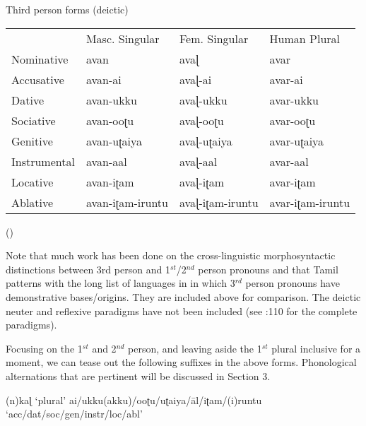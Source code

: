 \documentclass[output=paper,colorlinks,citecolor=brown,
]{langscibook}
\begin{document}
\begin{exe}
\begin{xlist}
\ex \label{new2c} Third person forms (deictic) 
\begin{table}[ht]
\begin{tabular}{llll}
             & Masc. Singular   & Fem. Singular    & Human Plural     \\
Nominative   & avan             & avaɭ             & avar             \\
Accusative   & avan-ai          & avaɭ-ai          & avar-ai          \\
Dative       & avan-ukku        & avaɭ-ukku        & avar-ukku        \\
Sociative    & avan-ooʈu        & avaɭ-ooʈu        & avar-ooʈu        \\
Genitive     & avan-uʈaiya      & avaɭ-uʈaiya      & avar-uʈaiya      \\
Instrumental & avan-aal         & avaɭ-aal         & avar-aal         \\
Locative     & avan-iʈam        & avaɭ-iʈam        & avar-iʈam        \\
Ablative     & avan-iʈam-iruntu & avaɭ-iʈam-iruntu & avar-iʈam-iruntu
\end{tabular} 
\end{table} (\citet{steever2019dravidian})

\end{xlist}
\end{exe}

Note that much work has been done on the cross-linguistic morphosyntactic distinctions between 3rd person and 1$^{st}$/2$^{nd}$ person pronouns and that Tamil patterns with the long list of languages in \citet{harley2002person} in which 3$^{rd}$ person pronouns have demonstrative bases/origins. They are included above for comparison. The deictic neuter and reflexive paradigms have not been included (see \citet{steever2019dravidian}:110 for the complete paradigms). 

Focusing on the 1$^{st}$ and 2$^{nd}$ person, and leaving aside the 1$^{st}$ plural inclusive for a moment, we can tease out the following suffixes in the above forms. Phonological alternations that are pertinent will be discussed in Section 3.

\begin{exe}
\ex \label{new3}
\begin{xlist}
\ex \label{new3a}
(n)kaɭ \hspace{4cm} ‘plural’
\ex \label{new3b}
ai/ukku(akku)/ooʈu/uʈaiya/āl/iʈam/(i)runtu  \\ \hspace{9cm}  ‘acc/dat/soc/gen/instr/loc/abl’
\end{xlist}
\end{exe}
\end{document}
